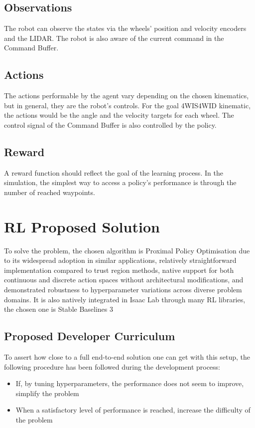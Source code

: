 \documentclass[11pt,a4paper,twocolumn]{article}
\begin{document}
\subsection{Observations}
The robot can observe the states via the wheels' position and velocity encoders and the LIDAR. The robot is also aware of the current command in the Command Buffer.

\subsection{Actions}
The actions performable by the agent vary depending on the chosen kinematics, but in general, they are the robot's controls. For the goal 4WIS4WID kinematic, the actions would be the angle and the velocity targets for each wheel. The control signal of the Command Buffer is also controlled by the policy.

\subsection{Reward}
A reward function should reflect the goal of the learning process. In the simulation, the simplest way to access a policy's performance is through the number of reached waypoints. 

\section{RL Proposed Solution}
To solve the problem, the chosen algorithm is Proximal Policy Optimisation \cite{Schulman2017ProximalPO} due to its widespread adoption in similar applications, relatively straightforward implementation compared to trust region methods, native support for both continuous and discrete action spaces without architectural modifications, and demonstrated robustness to hyperparameter variations across diverse problem domains. It is also natively integrated in Isaac Lab through many RL libraries, the chosen one is Stable Baselines 3 \cite{raffin2021stable}

\subsection{Proposed Developer Curriculum}
To assert how close to a full end-to-end solution one can get with this setup, the following procedure has been followed during the development process:
\begin{itemize}
    \item If, by tuning hyperparameters, the performance does not seem to improve, simplify the problem
    \item When a satisfactory level of performance is reached, increase the difficulty of the problem
\end{itemize}
\end{document}
